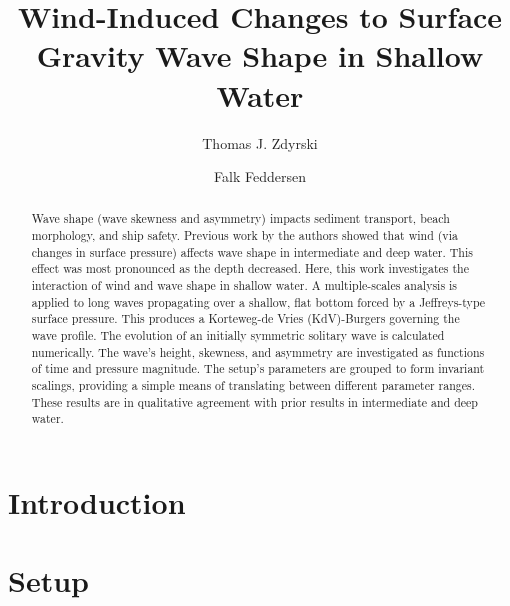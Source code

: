 \documentclass{jfm}
\title{Wind-Induced Changes to Surface Gravity Wave Shape in Shallow Water}
\author{Thomas J. Zdyrski \and Falk Feddersen}
\begin{document}
\maketitle

\begin{abstract}
Wave shape (\eg wave skewness and asymmetry) impacts sediment transport,
beach morphology, and ship safety.
Previous work by the authors showed that wind (via changes in surface
pressure) affects wave shape in intermediate and deep water.
This effect was most pronounced as the depth decreased.
Here, this work investigates the interaction of wind and wave shape in
shallow water.
A multiple-scales analysis is applied to long waves propagating over a
shallow, flat bottom forced by a Jeffreys-type surface pressure.
This produces a Korteweg-de Vries (KdV)-Burgers governing the wave
profile.
The evolution of an initially symmetric solitary wave is calculated
numerically.
The wave's height, skewness, and asymmetry are investigated as functions
of time and pressure magnitude.
The setup's parameters are grouped to form invariant scalings,
providing a simple means of translating between different parameter
ranges.
These results are in qualitative agreement with prior results in
intermediate and deep water.
\end{abstract}

\section{Introduction}

\section{Setup}
\end{document}
